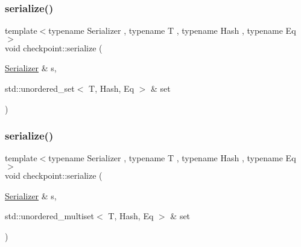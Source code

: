 \mbox{\label{namespacecheckpoint_ae4ca8cbc6daf2f5a2a20d44d9fe1cc9f}} 
\subsubsection{\texorpdfstring{serialize()}{serialize()}\hspace{0.1cm}{\footnotesize\ttfamily [24/25]}}
{\footnotesize\ttfamily template$<$typename Serializer , typename T , typename Hash , typename Eq $>$ \\
void checkpoint\+::serialize (\begin{DoxyParamCaption}\item[{\hyperlink{structcheckpoint_1_1_serializer}{Serializer} \&}]{s,  }\item[{std\+::unordered\+\_\+set$<$ T, Hash, Eq $>$ \&}]{set }\end{DoxyParamCaption})\hspace{0.3cm}{\ttfamily [inline]}}

\mbox{\label{namespacecheckpoint_a64c8a1aa29d469bc71c88a8836264ecc}} 
\subsubsection{\texorpdfstring{serialize()}{serialize()}\hspace{0.1cm}{\footnotesize\ttfamily [25/25]}}
{\footnotesize\ttfamily template$<$typename Serializer , typename T , typename Hash , typename Eq $>$ \\
void checkpoint\+::serialize (\begin{DoxyParamCaption}\item[{\hyperlink{structcheckpoint_1_1_serializer}{Serializer} \&}]{s,  }\item[{std\+::unordered\+\_\+multiset$<$ T, Hash, Eq $>$ \&}]{set }\end{DoxyParamCaption})\hspace{0.3cm}{\ttfamily [inline]}}

\mbox{\label{namespacecheckpoint_a9c880ba9bb9a106e784e06554b2fbcf2}} 
